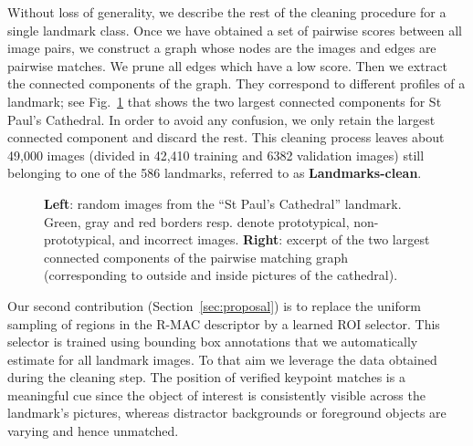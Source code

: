 \documentclass[runningheads]{llncs}
\newcommand{\myparagraph}[1]{\noindent {\bf #1.}}
\begin{document}
Without loss of generality, we describe the rest of the cleaning procedure for a single landmark class. Once we have
obtained a set of pairwise scores between all image pairs, we construct a graph whose nodes are the images and edges are
pairwise matches.  We prune all edges which have a low score.
Then we extract the connected components of the graph.  They correspond to different
profiles of a landmark; see Fig.~\ref{fig:cc} that shows the two largest connected components for St Paul's Cathedral.
In order to avoid any confusion, we only retain the largest connected component and discard the rest.
This cleaning process leaves about 49,000 images (divided in 42,410 training and 6382 validation images) still belonging
to one of the 586 landmarks, referred to as \textbf{Landmarks-clean}.


\begin{figure}[t!]
\begin{centering}
\par\end{centering}
\caption{\label{fig:cc}\textbf{Left}: random images from the ``St Paul's Cathedral''
landmark. Green, gray and red borders resp. denote prototypical, non-prototypical, and incorrect images.
\textbf{Right}: excerpt of the two largest connected components of the pairwise matching graph (corresponding
to outside and inside pictures of the cathedral).}
\end{figure}


\myparagraph{Bounding box estimation}
Our second contribution (Section~\ref{sec:proposal}) is 
to replace the uniform sampling of regions in
the R-MAC descriptor by a learned ROI selector.
This selector is trained using bounding box annotations that we automatically estimate for all landmark images.
To that aim we leverage the data obtained during the cleaning step.
The position of verified keypoint matches is a meaningful cue since the object of interest is consistently
visible across the landmark's pictures, whereas distractor backgrounds or foreground objects are varying and hence
unmatched.
\end{document}
